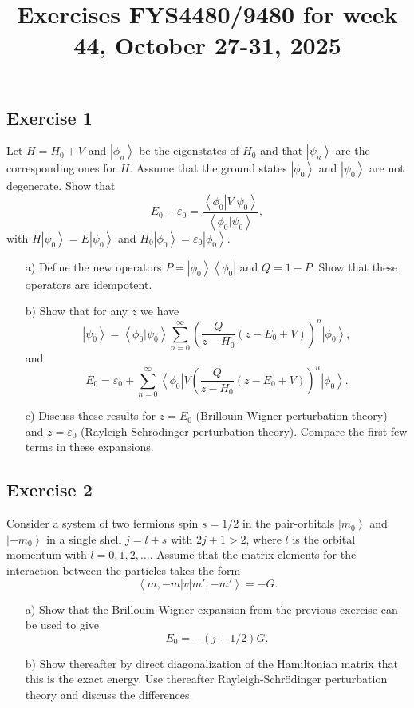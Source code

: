 \documentclass[prc]{revtex4}
\newcommand{\bra}[1]{\left\langle #1 \right|}
\newcommand{\ket}[1]{\left| #1 \right\rangle}
\begin{document}
\title{Exercises FYS4480/9480 for week 44, October 27-31, 2025}

\maketitle

\subsection*{Exercise 1}
Let $H=H_0 +V$ and $\ket{\phi_n}$ be the eigenstates of $H_0$ and that
$\ket{\psi_n}$ are the corresponding ones for $H$. 
Assume that the ground states
$\ket{\phi_0}$ and $\ket{\psi_0}$ are not degenerate. Show that
\[
E_0 -\varepsilon_0 =\frac{\bra{\phi_0} V\ket{\psi_0}}
{\left\langle \phi_0 | \psi_0 \right\rangle},
\]
with $H\ket{\psi_0} =E\ket{\psi_0}$ and
$H_0\ket{\phi_0} =\varepsilon_0\ket{\phi_0}$.
\begin{enumerate}
\item[a)]
Define the new operators $P=\ket{\phi_0}\bra{\phi_0}$ and $Q=1-P$. Show that these operators are idempotent.
\item[b)]
Show that for any  $z$ we have 
\[
\ket{\psi_0}=
	    \left\langle \phi_0 | \psi_0 \right\rangle
	    \sum_{n=0}^{\infty}\left(\frac{Q}{z-H_0}(z-E_0+V)\right)^n
	    \ket{\phi_0},
\]
and
\[
E_0=\varepsilon_0+
    \sum_{n=0}^{\infty}\bra{\phi_0}V
    \left(\frac{Q}{z-H_0}(z-E_0+V)\right)^n
    \ket{\phi_0}.
\]
\item[c)]
Discuss these results  for $z=E_0$ (Brillouin-Wigner perturbation theory)
and $z=\varepsilon_0$ (Rayleigh-Schr\"{o}dinger perturbation theory).
Compare the first few terms in these expansions.
\end{enumerate}
\subsection*{Exercise 2}
Consider a system of two fermions spin $s=1/2$ in the pair-orbitals
$\ket{m_0}$ and $\ket{-m_0}$ in a single shell $j=l+s$ with $2j+1>2$, where $l$ is the orbital momentum with $l=0,1,2,\dots$.
Assume that the matrix elements for the interaction between the particles
takes the form
\[
\bra{m,-m}v\ket{m',-m'}=-G.
\]
\begin{enumerate}
\item[a)]
Show that the Brillouin-Wigner expansion from the previous exercise can be used
to give
\[
E_0=-(j+1/2)G.
\]
\item[b)] Show thereafter by direct diagonalization of the  Hamiltonian
matrix that this is the exact energy. Use thereafter 
Rayleigh-Schr\"{o}dinger perturbation theory and discuss the differences.
\end{enumerate}
\end{document}
